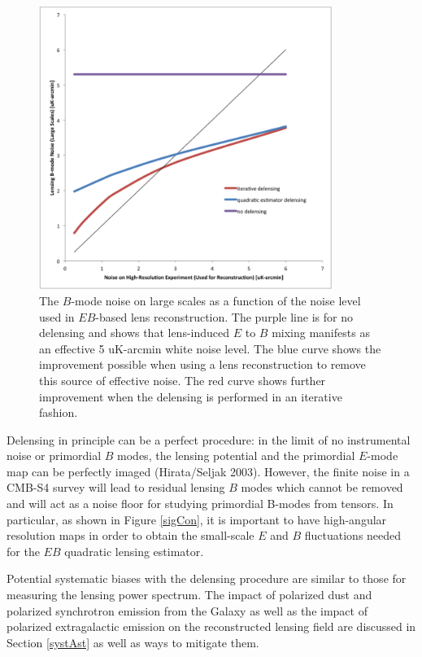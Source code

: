 \begin{figure}[h]
\centering
\includegraphics[width=0.85\textwidth]{CMBLensing/delensingIterative.png}
\vspace{0.3cm}
\caption{The $B$-mode noise on large scales as a function of the noise level used in $EB$-based lens reconstruction.  The purple line is for no delensing and shows that lens-induced  $E$ to $B$ mixing manifests as an effective 5 uK-arcmin white noise level.  The blue curve shows the improvement possible when using a lens reconstruction to remove this source of effective noise.  The red curve shows further improvement when the delensing is performed in an iterative fashion.}
\label{iterative}
\end{figure}

Delensing in principle can be a perfect procedure: in the limit of no instrumental noise or primordial $B$ modes, the lensing potential and the primordial $E$-mode map can be perfectly imaged (Hirata/Seljak 2003).  However, the finite noise in a CMB-S4 survey will lead to residual lensing $B$ modes which cannot be removed and will act as a noise floor for studying primordial B-modes from tensors.  
In particular, as shown in Figure \ref{sigCon}, it is important to have high-angular resolution maps in order to obtain the small-scale $E$ and $B$ fluctuations needed for the $EB$ quadratic lensing estimator.

Potential systematic biases with the delensing procedure are similar to those for measuring the lensing power spectrum. The impact of polarized dust and polarized synchrotron emission from the Galaxy as well as the impact of polarized extragalactic emission on the reconstructed lensing field are discussed in Section \ref{systAst} as well as ways to mitigate them.

